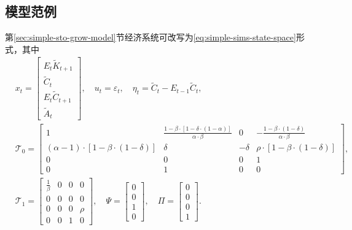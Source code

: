 \subsection{模型范例}
第\ref{sec:simple-sto-grow-model}节经济系统可改写为\eqref{eq:simple-sims-state-space}形式，其中
\begin{equation}
  \begin{split}
    &x_{t} = \begin{bmatrix}
    E_t \tilde{K}_{t+1} \\
    \tilde{C}_t \\
    E_t \tilde{C}_{t+1} \\
    \tilde{A}_t
  \end{bmatrix}, \quad u_t = \varepsilon_t, \quad \eta_t = \tilde{C}_t - E_{t-1} \tilde{C}_t, \\
  & \mathcal{T}_0 = \begin{bmatrix}
  1 & \frac{1-\beta \cdot \left[ 1-\delta \cdot \left( 1-\alpha \right) \right]}{\alpha \cdot \beta} & 0 & - \frac{1-\beta \cdot \left( 1-\delta \right)}{\alpha \cdot \beta} \\
  \left( \alpha - 1 \right) \cdot \left[ 1-\beta \cdot \left( 1-\delta \right) \right] & \delta & -\delta & \rho \cdot \left[ 1-\beta \cdot \left( 1-\delta \right) \right] \\
  0 & 0 & 0 & 1 \\
  0 & 1 & 0 & 0
 \end{bmatrix},\\
 &\mathcal{T}_1 = \begin{bmatrix}
 \frac{1}{\beta} & 0 & 0 & 0 \\
 0 & 0 & 0 & 0 \\
 0 & 0 & 0 & \rho \\
 0 & 0 & 1 & 0
 \end{bmatrix}, \quad \Psi = \begin{bmatrix}
 0 \\ 0 \\ 1 \\ 0
 \end{bmatrix}, \quad \Pi = \begin{bmatrix}
 0 \\ 0 \\ 0 \\ 1
 \end{bmatrix}.
  \end{split}
\end{equation}

